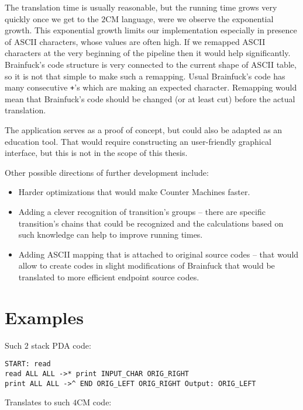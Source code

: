 \documentclass[english,shortabstract,mgr]{iithesis}
\begin{document}
The translation time is usually reasonable, but the running time grows
very quickly once we get to the $2$CM language, were we observe the exponential growth.
This exponential growth limits our implementation especially in presence of ASCII
characters, whose values are often high.
If we remapped ASCII characters at the very beginning of the pipeline
then it would help significantly. Brainfuck's code structure is very connected
to the current shape of ASCII table, so it is not that simple to make such a remapping.
Usual Brainfuck's code has many consecutive \texttt{+}'s which are making
an expected character. Remapping would mean that Brainfuck's code should be changed
(or at least cut) before the actual translation.

The application serves as a proof of concept, but could also be adapted
as an education tool. That would require constructing an user-friendly
graphical interface, but this is not in the scope of this thesis.

Other possible directions of further development include:
\begin{itemize}
  \item Harder optimizations that would make Counter Machines faster.
  \item Adding a clever recognition of transition's groups -- there are specific
      transition's chains that could be recognized and the calculations
      based on such knowledge can help to improve running times.
  \item Adding ASCII mapping that is attached to original source codes -- that
      would allow to create codes in slight modifications of Brainfuck that
      would be translated to more efficient endpoint source codes.
\end{itemize}



{}

\appendix

\chapter{Examples}


Such $2$ stack PDA code:

\begin{verbatim}
START: read
read ALL ALL ->* print INPUT_CHAR ORIG_RIGHT
print ALL ALL ->^ END ORIG_LEFT ORIG_RIGHT Output: ORIG_LEFT
\end{verbatim}

Translates to such $4$CM code:
\end{document}

